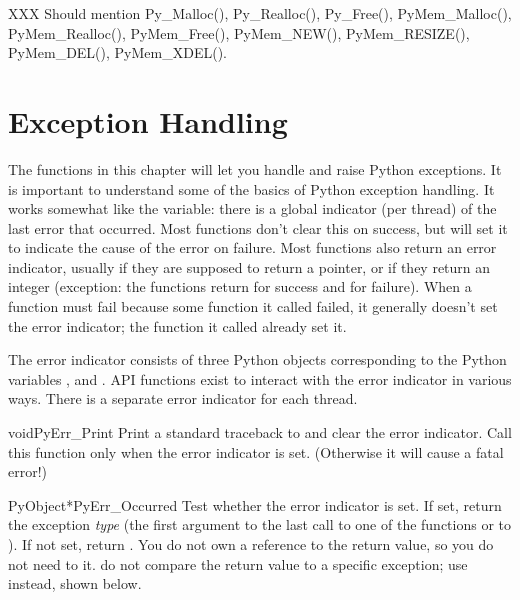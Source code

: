 \documentclass{manual}
\begin{document}
XXX Should mention Py_Malloc(), Py_Realloc(), Py_Free(),
PyMem_Malloc(), PyMem_Realloc(), PyMem_Free(), PyMem_NEW(),
PyMem_RESIZE(), PyMem_DEL(), PyMem_XDEL().


\chapter{Exception Handling \label{exceptionHandling}}

The functions in this chapter will let you handle and raise Python
exceptions.  It is important to understand some of the basics of
Python exception handling.  It works somewhat like the \UNIX{}
 variable: there is a global indicator (per thread) of the
last error that occurred.  Most functions don't clear this on success,
but will set it to indicate the cause of the error on failure.  Most
functions also return an error indicator, usually \NULL{} if they are
supposed to return a pointer, or  if they return an integer
(exception: the  functions return  for
success and  for failure).  When a function must fail because
some function it called failed, it generally doesn't set the error
indicator; the function it called already set it.

The error indicator consists of three Python objects corresponding to
the Python variables ,  and
.  API functions exist to interact with the
error indicator in various ways.  There is a separate error indicator
for each thread.


\begin{cfuncdesc}{void}{PyErr_Print}{}
Print a standard traceback to  and clear the error
indicator.  Call this function only when the error indicator is set.
(Otherwise it will cause a fatal error!)
\end{cfuncdesc}

\begin{cfuncdesc}{PyObject*}{PyErr_Occurred}{}
Test whether the error indicator is set.  If set, return the exception
\emph{type} (the first argument to the last call to one of the
 functions or to ).  If
not set, return \NULL{}.  You do not own a reference to the return
value, so you do not need to  it.
 do not compare the return value to a specific
exception; use  instead, shown
below.
\end{cfuncdesc}
\end{document}
